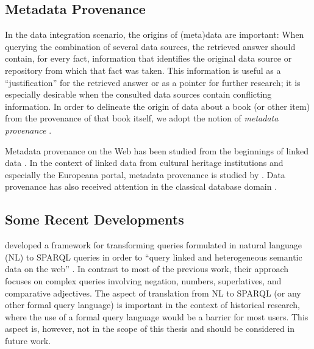 \subsection{Metadata Provenance}
\label{subsec:data_provenance}

In the data integration scenario, the origins of (meta)data are important:
When querying the combination of several data sources, the retrieved answer
should contain, for every fact, information that identifies the original data source or repository
from which that fact was taken.
This information is useful as a \enquote{justification} for the retrieved answer
or as a pointer for further research;
it is especially desirable when the consulted data sources contain conflicting information.
In order to delineate the origin of data about a book (or other item)
from the provenance of that book itself,
we adopt the notion of \emph{metadata provenance} \autocite{Eckert2012}.

Metadata provenance on the Web
has been studied
from the beginnings of linked data
\autocite[see, e.g.][]{Hartig2009,Moreau2008,Moreau2008a}.
In the context of linked data from cultural heritage institutions
and especially the Europeana portal,
metadata provenance is studied by
\citeauthor{Eckert2013} \autocite*{Eckert2013,Eckert2013a,Eckert2012}.
Data provenance has also received attention 
in the classical database domain
\autocite[see, e.g.,][§14]{Doan2012}.

\subsection{Some Recent Developments}


\textcite{Boumechaal2023} developed a framework for transforming queries formulated in natural language (NL)
to SPARQL queries in order to \enquote{query linked and heterogeneous semantic data on the web}
\autocite[p.1]{Boumechaal2023}.
In contrast to most of the previous work, their approach focuses on complex queries
involving negation, numbers, superlatives, and comparative adjectives.
The aspect of translation from NL to \gls{SPARQL} (or any other formal query language)
is important in the context of historical research, where the use of a formal query language
would be a barrier for most users. This aspect is, however, not in the scope of this thesis
and should be considered in future work.

